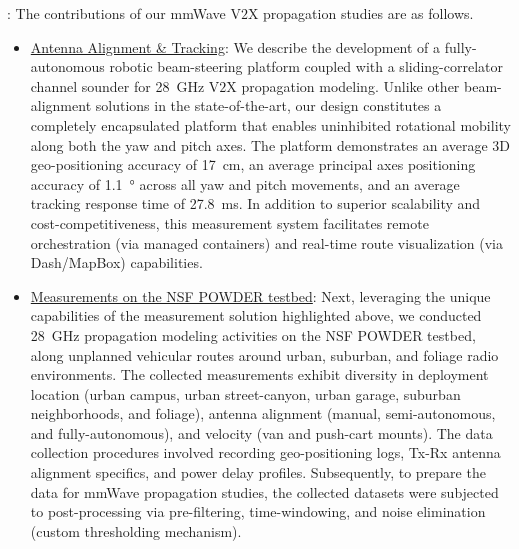 \documentclass[12pt, draftcls, onecolumn]{IEEEtran}
\begin{document}
: The contributions of our mmWave V$2$X propagation studies are as follows.
\begin{itemize}[leftmargin=*]
    \item \underline{Antenna Alignment \& Tracking}: We describe the development of a fully-autonomous robotic beam-steering platform coupled with a sliding-correlator channel sounder for \SI{28}{\giga\hertz} V$2$X propagation modeling. Unlike other beam-alignment solutions in the state-of-the-art, our design constitutes a completely encapsulated platform that enables uninhibited rotational mobility along both the yaw and pitch axes. The platform demonstrates an average $3$D geo-positioning accuracy of \SI{17}{\centi\meter}, an average principal axes positioning accuracy of \SI{1.1}{\degree} across all yaw and pitch movements, and an average tracking response time of \SI{27.8}{\milli\second}. In addition to superior scalability and cost-competitiveness, this measurement system facilitates remote orchestration (via managed containers) and real-time route visualization (via Dash/MapBox) capabilities.
    \item \underline{Measurements on the NSF POWDER testbed}: Next, leveraging the unique capabilities of the measurement solution highlighted above, we conducted \SI{28}{\giga\hertz} propagation modeling activities on the NSF POWDER testbed, along unplanned vehicular routes around urban, suburban, and foliage radio environments. The collected measurements exhibit diversity in deployment location (urban campus, urban street-canyon, urban garage, suburban neighborhoods, and foliage), antenna alignment (manual, semi-autonomous, and fully-autonomous), and velocity (van and push-cart mounts). The data collection procedures involved recording geo-positioning logs, Tx-Rx antenna alignment specifics, and power delay profiles. Subsequently, to prepare the data for mmWave propagation studies, the collected datasets were subjected to post-processing via pre-filtering, time-windowing, and noise elimination (custom thresholding mechanism).

\end{itemize}
\end{document}
